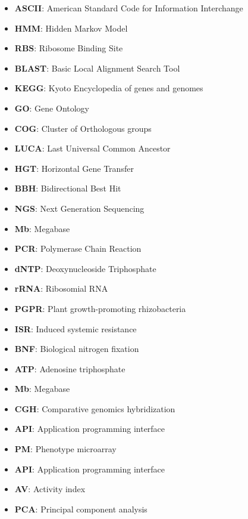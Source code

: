 \begin{itemize}
\item \textbf{ASCII}: American Standard Code for Information Interchange
\item \textbf{HMM}: Hidden Markov Model
\item \textbf{RBS}: Ribosome Binding Site
\item \textbf{BLAST}: Basic Local Alignment Search Tool
\item \textbf{KEGG}: Kyoto Encyclopedia of genes and genomes
\item \textbf{GO}: Gene Ontology
\item \textbf{COG}: Cluster of Orthologous groups
\item \textbf{LUCA}: Last Universal Common Ancestor
\item \textbf{HGT}: Horizontal Gene Transfer
\item \textbf{BBH}: Bidirectional Best Hit
\item \textbf{NGS}: Next Generation Sequencing
\item \textbf{Mb}: Megabase
\item \textbf{PCR}: Polymerase Chain Reaction
\item \textbf{dNTP}: Deoxynucleoside Triphosphate
\item \textbf{rRNA}: Ribosomial RNA
\item \textbf{PGPR}: Plant growth-promoting rhizobacteria
\item \textbf{ISR}: Induced systemic resistance
\item \textbf{BNF}: Biological nitrogen fixation
\item \textbf{ATP}: Adenosine triphosphate
\item \textbf{Mb}: Megabase
\item \textbf{CGH}: Comparative genomics hybridization
\item \textbf{API}: Application programming interface
\item \textbf{PM}: Phenotype microarray
\item \textbf{API}: Application programming interface
\item \textbf{AV}: Activity index
\item \textbf{PCA}: Principal component analysis
\end{itemize}